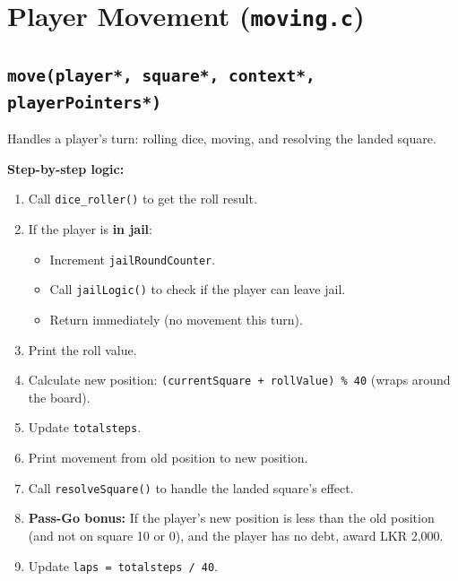 \documentclass[12pt,a4paper]{article}
\begin{document}
\newpage

\section{Player Movement (\texttt{moving.c})}

\subsection{\texttt{move(player*, square*, context*, playerPointers*)}}
Handles a player's turn: rolling dice, moving, and resolving the landed square.

\textbf{Step-by-step logic:}
\begin{enumerate}[noitemsep]
    \item Call \texttt{dice\_roller()} to get the roll result.
    \item If the player is \textbf{in jail}:
    \begin{itemize}[noitemsep]
        \item Increment \texttt{jailRoundCounter}.
        \item Call \texttt{jailLogic()} to check if the player can leave jail.
        \item Return immediately (no movement this turn).
    \end{itemize}
    \item Print the roll value.
    \item Calculate new position: \texttt{(currentSquare + rollValue) \% 40} (wraps around the board).
    \item Update \texttt{totalsteps}.
    \item Print movement from old position to new position.
    \item Call \texttt{resolveSquare()} to handle the landed square's effect.
    \item \textbf{Pass-Go bonus:} If the player's new position is less than the old position (and not on square 10 or 0), and the player has no debt, award LKR 2,000.
    \item Update \texttt{laps = totalsteps / 40}.
\end{enumerate}

\newpage

\end{document}
